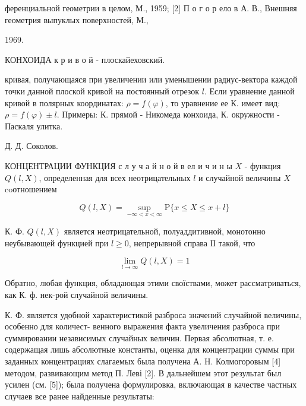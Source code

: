 \documentclass[10pt]{article}
\begin{document}
ференциальной геометрии в целом, М., 1959; [2] П о г о р ело в А. В., Внешняя геометрия выпуклых поверхностей, М.,



1969.



КОНХОИДА к р и в о й - плоскайеховский.

кривая, получающаяся при увеличении или уменышении радиус-вектора каждой точки данной плоской кривой на постоянный отрезок $l$. Если уравнение данной кривой в полярных координатах: $\rho=f(\varphi)$, то уравнение ее К. имеет вид: $\rho=f(\varphi) \pm l$. Примеры: К. прямой - Никомеда конхоида, К. окружности - Паскаля улитка.



Д. Д. Соколов.



КОНЦЕНТРАЦИИ ФУНКЦИЯ с л у ч а й н о й в ел и ч и н ы $X$ - функция $Q(l, X)$, определенная для всех неотрицательных $l$ и случайной величины $X$ coотношением



\[

Q(l, X)=\sup _{-\infty<x<\infty} \mathrm{P}\{x \leqslant X \leqslant x+l\}

\]



К. Ф. $Q(l, X)$ является неотрицательной, полуаддитивной, монотонно неубывающей функцией при $l \geqslant 0$, непрерывной справа ІІ такой, что



\[

\lim _{l \rightarrow \infty} Q(l, X)=1

\]



Обратно, любая функция, обладающая этими своїствами, может рассматриваться, как К. ф. нек-рой случайной величины.



К. Ф. является удобной характеристикой разброса значений случайной величины, особенно для количест- венного выражения факта увеличения разброса при суммировании независимых случайных величин. Первая абсолютная, т. е. содержащая лишь абсолютные константы, оценка для концентрации суммы при заданных концентрациях слагаемых была получена А. H. Колмогоровым [4] методом, развивающим метод П. Леві [2]. В дальнейшем этот результат был усилен (см. [5]); была получена формулировка, включающая в качестве частных случаев все ранее найденные результаты:
\end{document}
